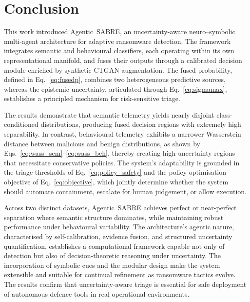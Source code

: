 \documentclass[lettersize,journal]{IEEEtran}
\begin{document}
\section{Conclusion}
\label{sec:conclusion}

This work introduced Agentic~SABRE, an uncertainty-aware neuro–symbolic multi-agent architecture for adaptive ransomware detection. The framework integrates semantic and behavioural classifiers, each operating within its own representational manifold, and fuses their outputs through a calibrated decision module enriched by synthetic CTGAN augmentation. The fused probability, defined in Eq.~\eqref{eq:fusedp}, combines two heterogeneous predictive sources, whereas the epistemic uncertainty, articulated through Eq.~\eqref{eq:sigmamax}, establishes a principled mechanism for risk-sensitive triage.

The results demonstrate that semantic telemetry yields nearly disjoint class-conditioned distributions, producing fused decision regions with extremely high separability. In contrast, behavioural telemetry exhibits a narrower Wasserstein distance between malicious and benign distributions, as shown by Eqs.~\eqref{eq:wass_sem}--\eqref{eq:wass_beh}, thereby creating high-uncertainty regions that necessitate conservative policies. The system’s adaptability is grounded in the triage thresholds of Eq.~\eqref{eq:policy_safety} and the policy optimisation objective of Eq.~\eqref{eq:objective}, which jointly determine whether the system should automate containment, escalate for human judgement, or allow execution.

Across two distinct datasets, Agentic~SABRE achieves perfect or near-perfect separation where semantic structure dominates, while maintaining robust performance under behavioural variability. The architecture's agentic nature, characterised by self-calibration, evidence fusion, and structured uncertainty quantification, establishes a computational framework capable not only of detection but also of decision-theoretic reasoning under uncertainty. The incorporation of symbolic cues and the modular design make the system extensible and suitable for continual refinement as ransomware tactics evolve. The results confirm that uncertainty-aware triage is essential for safe deployment of autonomous defence tools in real operational environments.

\end{document}
